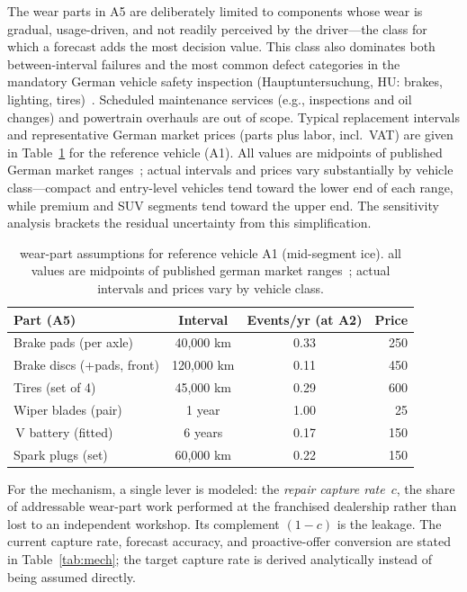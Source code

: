 \documentclass[conference,a4paper]{IEEEtran}
\newcommand{\eur}{\ifmmode\text{\texteuro}\else\texteuro\fi}
\begin{document}
The wear parts in A5 are deliberately limited to components whose wear is
gradual, usage-driven, and not readily perceived by the driver---the class
for which a forecast adds the most decision value. This class also dominates
both between-interval failures and the most common defect categories in the
mandatory German vehicle safety inspection (Hauptuntersuchung, HU: brakes,
lighting, tires)~\cite{tuev2026report}. Scheduled maintenance services
(e.g., inspections and oil changes) and powertrain overhauls are out of scope. Typical replacement
intervals and representative German market prices (parts plus
labor, incl.\ VAT) are given in Table~\ref{tab:wear} for the reference
vehicle (A1). All values are midpoints of published German
market ranges~\cite{adac2024repair}; actual intervals and prices vary
substantially by vehicle class---compact and entry-level vehicles
tend toward the lower end of each range, while premium and
SUV segments tend toward the upper end. The sensitivity analysis
brackets the residual uncertainty from this simplification.
 
\begin{table}[H]
\caption{wear-part assumptions for reference vehicle A1 (mid-segment ice). all values are midpoints of published german market ranges~\cite{adac2024repair}; actual intervals and prices vary by vehicle class.}
\label{tab:wear}
\centering
\begin{tabularx}{\columnwidth}{@{} >{\raggedright\arraybackslash}X c c r @{}}
\toprule
\textbf{Part (A5)} & \textbf{Interval} & \textbf{Events/yr} (at A2) & \textbf{Price} \\
\midrule
Brake pads (per axle)      & 40{,}000 km  & 0.33 & \eur\,250 \\
Brake discs (+pads, front) & 120{,}000 km & 0.11 & \eur\,450 \\
Tires (set of 4)           & 45{,}000 km  & 0.29 & \eur\,600 \\
Wiper blades (pair)        & 1 year       & 1.00 & \eur\,25  \\
12\,V battery (fitted)     & 6 years      & 0.17 & \eur\,150 \\
Spark plugs (set)          & 60{,}000 km  & 0.22 & \eur\,150 \\
\bottomrule
\end{tabularx}
\end{table}

For the mechanism, a single lever is modeled: the \emph{repair capture rate}~$c$,
the share of addressable wear-part work performed at the franchised dealership
rather than lost to an independent workshop. Its complement $(1-c)$ is the
leakage. The current capture rate, forecast accuracy, and proactive-offer
conversion are stated in Table~\ref{tab:mech}; the target capture rate is derived
analytically instead of being assumed directly.
\end{document}
